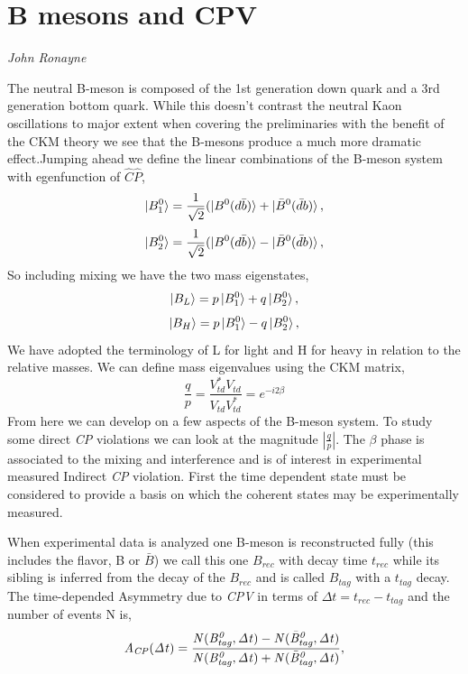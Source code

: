 %

\section{B mesons and CPV}
\vspace{-1.0em}
\begin{center}
\tiny{\textit{John Ronayne}}
\end{center}

The neutral B-meson is composed of the 1st generation down quark and a 3rd generation bottom quark. While this doesn't contrast the neutral Kaon oscillations to major extent when covering the preliminaries with the benefit of the CKM theory we see that the B-mesons produce a much more dramatic effect.Jumping ahead we define the linear combinations of the B-meson system with egenfunction of $\hat{C}\hat{P}$,
\[\ket{B^{0}_{1}}=\frac{1}{\sqrt{2}}(\ket{B^{0}(d\bar{b})}+\ket{\bar{B}^{0}(\bar{d}b)},\]
\[\ket{B^{0}_{2}}=\frac{1}{\sqrt{2}}(\ket{B^{0}(d\bar{b})}-\ket{\bar{B}^{0}(\bar{d}b)},\]
So including mixing we have the two mass eigenstates,
\[\ket{B_{L}}=p\ket{B^{0}_{1}}+q\ket{{B}^{0}_{2}},\]
\[\ket{B_{H}}=p\ket{B^{0}_{1}}-q\ket{{B}^{0}_{2}},\]
We have adopted the terminology of L for light and H for heavy in relation to the relative masses. We can define mass eigenvalues using the CKM matrix,
\[\frac{q}{p}=\frac{V^{*}_{td}V_{td}}{V_{td}V^{*}_{td}}=e^{-i2\beta}\]
From here we can develop on a few aspects of the B-meson system. To study some direct  \textit{CP} violations we can look at the magnitude  $\left| \frac{q}{p} \right|$. The $\beta$ phase is associated to the mixing and interference and is of interest in experimental measured Indirect  \textit{CP} violation. First the time dependent state must be considered to provide a basis on which the coherent states may be experimentally measured. 


When experimental data is analyzed one B-meson is reconstructed fully (this includes the flavor, B or $\bar{B}$) we call this one $B_{rec}$ with decay time $t_{rec}$ while its sibling is inferred from the decay of the $B_{rec}$ and is called $B_{tag}$ with a $t_{tag}$ decay. The time-depended Asymmetry due to \textit{CPV} in terms of $\Delta{t} = t_{rec}-t_{tag}$ and the number of events N is,
\[\it{A}_{CP}(\Delta t)= \frac{N(B^{0}_{tag},\Delta t)-N(\bar{B}^{0}_{tag},\Delta t)}{N(B^{0}_{tag},\Delta t)+N(\bar{B}^{0}_{tag},\Delta t)},\]



